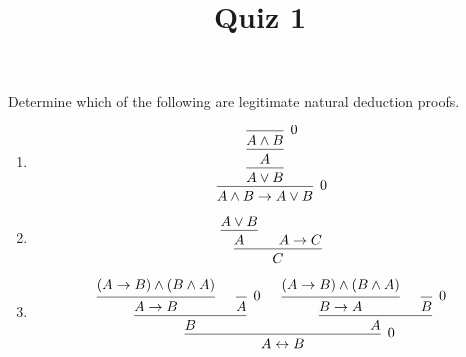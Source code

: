 \documentclass[12pt]{amsart}
\theoremstyle{definition}
\begin{document}
\title{Quiz 1}

\maketitle

Determine which of the following are legitimate natural deduction proofs.
\begin{enumerate}
\item 
\begin{displaymath}
\begin{prooftree}
	\infer0[0]{A \land B}
	\infer1{A}
	\infer1{A \lor B}
	\infer1[0]{A \land B \to A \lor B}
\end{prooftree}
\end{displaymath}

\item 
\begin{displaymath}
\begin{prooftree}
	\hypo{A \lor B}
	\infer1{A}
	\hypo{A \to C}
	\infer2{C}
\end{prooftree}
\end{displaymath}

\item 
\begin{displaymath}
\begin{prooftree}
	\hypo{(A \to B) \land (B \land A)}
	\infer1{A \to B} 
	\infer0[0]{A}
	\infer2{B}
	\hypo{(A \to B) \land (B \land A)}
	\infer1{B \to A}
	\infer0[0]{B}
	\infer2{A}
	\infer2[0]{A \leftrightarrow B}
\end{prooftree}
\end{displaymath}

\end{enumerate}
\end{document}
